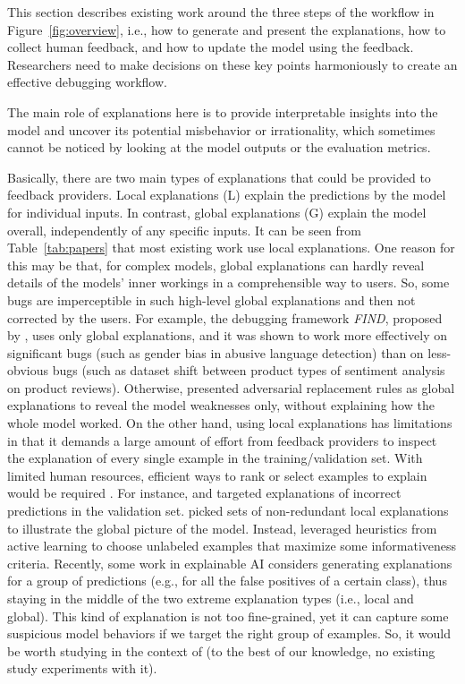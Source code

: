 \label{subsec:workflow}
This section describes existing work around the three steps of the \EBHD workflow in Figure~\ref{fig:overview}, i.e., how to generate and present the explanations, how to collect human feedback, and how to update the model using the feedback.
Researchers need to make decisions on these key points harmoniously to create an effective debugging workflow.

The main role of explanations here is to 
provide interpretable insights into the model and uncover its potential misbehavior or irrationality, which sometimes cannot be noticed by looking at the model outputs or the evaluation metrics.

Basically, there are two main types of explanations that could be provided to feedback providers. Local explanations (L) explain the predictions by the model for individual inputs. 
In contrast, global explanations (G) explain the model overall, independently of any specific inputs.
It can be seen from Table~\ref{tab:papers} that most existing work use local explanations.
One reason for this may be that,
for complex models, 
global explanations can hardly reveal 
details of the models' inner workings 
in a comprehensible way to users. 
So, some bugs are imperceptible in such high-level global explanations and then not corrected by the users.
For example, the debugging framework \textit{FIND}, proposed by , uses only global explanations, and it was shown to work more effectively on significant bugs (such as gender bias in abusive language detection) than on less-obvious bugs (such as dataset shift between product types of sentiment analysis on product reviews). 
Otherwise,  presented adversarial replacement rules as global explanations to reveal the model weaknesses only, without explaining how the whole model worked. 
On the other hand, using local explanations has limitations in that it demands a large amount of effort from feedback providers to inspect the explanation of every single example in the training/validation set.
With limited human resources, efficient ways to rank or select examples to explain would be required .
For instance, 
 and  targeted explanations of incorrect predictions in the validation set.
 picked sets of non-redundant local explanations to illustrate the global picture of the model. 
Instead,  leveraged heuristics from active learning to choose unlabeled examples that maximize some informativeness criteria.
Recently, some work in explainable AI considers generating explanations for a group of predictions  (e.g., for all the false positives of a certain class), thus staying in the middle of the two extreme explanation types (i.e., local and global). 
This kind of explanation is not too fine-grained, yet it can capture some suspicious model behaviors if we target the right group of examples.
So, it would be worth studying in the context of \EBHD 
(to the best of our knowledge, no existing study experiments with it).

